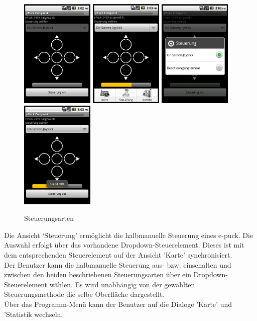 \documentclass[10pt,a4paper]{article}
\begin{document}
			\begin{figure}[h]
				  \centering
				\includegraphics[width=3.5cm]{screenshots_neu/control.png}
				\includegraphics[width=3.5cm]{screenshots_neu/control_menu.png}
				\includegraphics[width=3.5cm]{screenshots_neu/control_spinner.png}
				\includegraphics[width=3.5cm]{screenshots_neu/control_speed.png}				
  				\caption{Steuerungsarten}
  			\end{figure}	
			
			Die Ansicht `Steuerung' ermöglicht die halbmanuelle Steuerung eines e-puck. Die Auswahl erfolgt über das vorhandene
			Dropdown-Steuerelement. Dieses ist mit dem entsprechenden Steuerelement auf der Ansicht 'Karte' synchronisiert.	\\ 
			Der Benutzer kann die halbmanuelle Steuerung	aus- bzw. einschalten und zwischen den beiden beschriebenen
			Steuerungsarten über ein Dropdown-Steuerelement wählen. Es wird unabhängig von der gewählten Steuerungsmethode die selbe
			Oberfläche dargestellt. \\
			Über das Programm-Menü kann der Benutzer auf die Dialoge 'Karte' und 'Statistik wechseln.
\end{document}

